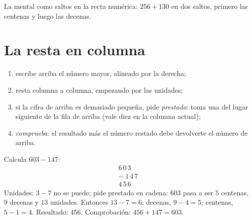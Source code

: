 \begin{omfigure}

{\small La  mental como saltos en la recta numérica: $256 + 130$ en
dos saltos, primero las centenas y luego las decenas.}
\end{omfigure}

\section{La resta en columna}

\begin{method}\label{met:g3:addsub:sub}
\begin{enumerate}
  \item escribe arriba el número mayor, alineado por la derecha;
  \item resta columna a columna, empezando por las unidades;
  \item si la cifra de arriba es demasiado pequeña, pide \emph{prestado}: toma una del
        lugar siguiente de la fila de arriba (vale diez en la columna
        actual);
  \item \emph{comprueba}: el resultado más el número restado debe
        devolverte el número de arriba.
\end{enumerate}
\end{method}

\begin{example}\label{ex:g3:addsub:sub}
Calcula $603 - 147$:
\[
\begin{array}{r}
6\,0\,3 \\
-\ 1\,4\,7 \\
\hline
4\,5\,6
\end{array}
\]
Unidades: $3 - 7$ no se puede; pide prestado en cadena: $603$ pasa a ser
$5$ centenas, $9$ decenas y $13$ unidades. Entonces $13 - 7 = 6$;
decenas, $9 - 4 = 5$; centenas, $5 - 1 = 4$. Resultado: $456$.
Comprobación: $456 + 147 = 603$.
\end{example}

